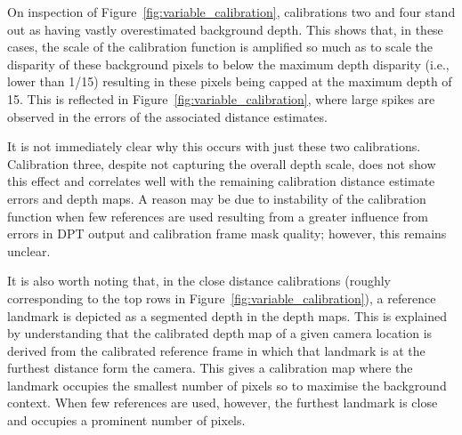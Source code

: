 On inspection of Figure~\ref{fig:variable_calibration}, calibrations two and four stand out as having
vastly overestimated background depth.
This shows that, in these cases, the scale of the calibration function is amplified so much as to scale
the disparity of these background pixels to below the maximum depth disparity (i.e., lower than 1/15)
resulting in these pixels being capped at the maximum depth of 15.
This is reflected in Figure~\ref{fig:variable_calibration}, where large spikes are observed in the errors
of the associated distance estimates.

It is not immediately clear why this occurs with just these two calibrations.
Calibration three, despite not capturing the overall depth scale, does not show this effect and
correlates well with the remaining calibration distance estimate errors and depth maps.
A reason may be due to instability of the calibration function when few references are used
resulting from a greater influence from errors in DPT output and calibration frame mask quality;
however, this remains unclear.

It is also worth noting that, in the close distance calibrations (roughly corresponding to the top
rows in Figure~\ref{fig:variable_calibration}), a reference landmark is depicted as a segmented depth
in the depth maps.
This is explained by understanding that the calibrated depth map of a given camera location is
derived from the calibrated reference frame in which that landmark is at the furthest distance form
the camera\cite{HAUCKE2022101536}.
This gives a calibration map where the landmark occupies the smallest number of pixels so to maximise
the background context.
When few references are used, however, the furthest landmark is close and occupies a prominent number
of pixels.

